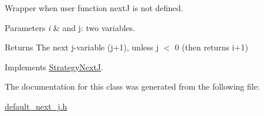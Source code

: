 \-Wrapper when user function next\-J is not defined. 


\begin{DoxyParams}{\-Parameters}
{\em i} & and j\-: two variables. \\
\hline
\end{DoxyParams}
\begin{DoxyReturn}{\-Returns}
\-The next j-\/variable (j+1), unless j $<$ 0 (then returns i+1) 
\end{DoxyReturn}


\-Implements \hyperlink{classStrategyNextJ_ab566c4e5827240b575d0e7445b7ba695}{\-Strategy\-Next\-J}.



\-The documentation for this class was generated from the following file\-:\begin{DoxyCompactItemize}
\item 
\hyperlink{default__next__j_8h}{default\-\_\-next\-\_\-j.\-h}\end{DoxyCompactItemize}
